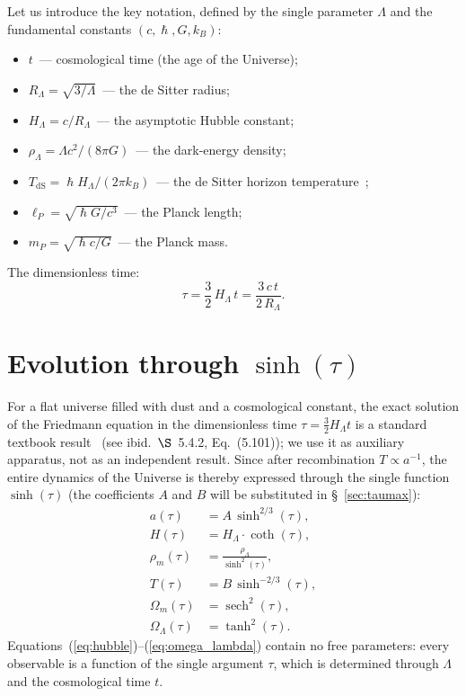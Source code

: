 \documentclass[10pt,a4paper]{article}
\DeclareRobustCommand{\hbar}{\hslash}
\begin{document}
Let us introduce the key notation, defined by the single parameter $\Lambda$ and the fundamental constants $(c, \hbar, G, k_B)$:

\begin{itemize}
\item $t$~--- cosmological time (the age of the Universe);
\item $R_\Lambda = \sqrt{3/\Lambda}$~--- the de Sitter radius;
\item $H_\Lambda = c/R_\Lambda$~--- the asymptotic Hubble constant;
\item $\rho_\Lambda = \Lambda c^2/(8\pi G)$~--- the dark-energy density;
\item $T_{\mathrm{dS}} = \hbar H_\Lambda/(2\pi k_B)$~--- the de Sitter horizon temperature~\cite{GibbonsHawking1977};
\item $\ell_P = \sqrt{\hbar G/c^3}$~--- the Planck length;
\item $m_P = \sqrt{\hbar c/G}$~--- the Planck mass.
\end{itemize}

The dimensionless time:
\begin{equation}
\boxed{\tau = \frac{3}{2}\,H_\Lambda\,t = \frac{3\,c\,t}{2\,R_\Lambda}.}
\end{equation}

\section{Evolution through \texorpdfstring{$\sinh(\tau)$}{sinh(τ)}}
\label{sec:sinh}

For a flat universe filled with dust and a cosmological constant, the exact solution of the Friedmann equation in the dimensionless time $\tau=\tfrac{3}{2}H_\Lambda t$ is a standard textbook result~\cite{Ryden2017} (see ibid.\ $\S$~5.4.2, Eq.~(5.101)); we use it as auxiliary apparatus, not as an independent result. Since after recombination $T \propto a^{-1}$, the entire dynamics of the Universe is thereby expressed through the single function $\sinh(\tau)$ (the coefficients $A$ and $B$ will be substituted in \S~\ref{sec:taumax}):
\begin{align}
a(\tau) &= A\,\sinh^{2/3}(\tau), \label{eq:a_sinh} \\[6pt]
H(\tau) &= H_\Lambda \cdot \coth(\tau), \label{eq:hubble} \\[6pt]
\rho_m(\tau) &= \frac{\rho_\Lambda}{\sinh^2(\tau)}, \label{eq:rho_m} \\[6pt]
T(\tau) &= B\,\sinh^{-2/3}(\tau), \label{eq:temp_sinh} \\[6pt]
\Omega_m(\tau) &= \operatorname{sech}^2(\tau), \label{eq:omega_m} \\[6pt]
\Omega_\Lambda(\tau) &= \tanh^2(\tau). \label{eq:omega_lambda}
\end{align}
Equations~(\ref{eq:hubble})--(\ref{eq:omega_lambda}) contain no free parameters: every observable is a function of the single argument $\tau$, which is determined through $\Lambda$ and the cosmological time $t$.
\end{document}
